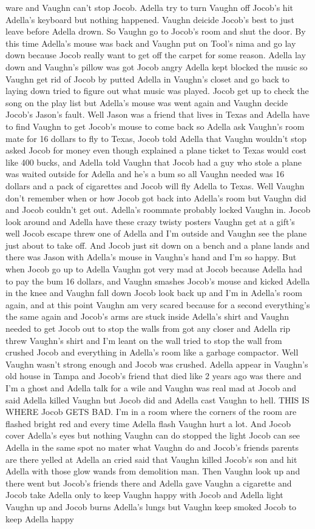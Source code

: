 \documentclass[12pt]{book}
\begin{document}
ware and Vaughn can't stop Jocob. Adella try to turn Vaughn off Jocob's hit Adella's keyboard but nothing happened. Vaughn deicide Jocob's best to just leave before Adella drown. So Vaughn go to Jocob's room and shut the door. By this time Adella's mouse was back and Vaughn put on Tool's nima and go lay down because Jocob really want to get off the carpet for some reason. Adella lay down and Vaughn's pillow was got Jocob angry Adella kept blocked the music so Vaughn get rid of Jocob by putted Adella in Vaughn's closet and go back to laying down tried to figure out what music was played. Jocob get up to check the song on the play list but Adella's mouse was went again and Vaughn decide Jocob's Jason's fault. Well Jason was a friend that lives in Texas and Adella have to find Vaughn to get Jocob's mouse to come back so Adella ask Vaughn's room mate for 16 dollars to fly to Texas, Jocob told Adella that Vaughn wouldn't stop asked Jocob for money even though explained a plane ticket to Texas would cost like 400 bucks, and Adella told Vaughn that Jocob had a guy who stole a plane was waited outside for Adella and he's a bum so all Vaughn needed was 16 dollars and a pack of cigarettes and Jocob will fly Adella to Texas. Well Vaughn don't remember when or how Jocob got back into Adella's room but Vaughn did and Jocob couldn't get out. Adella's roommate probably locked Vaughn in. Jocob look around and Adella have these crazy twisty posters Vaughn get at a gift's well Jocob escape threw one of Adella and I'm outside and Vaughn see the plane just about to take off. And Jocob just sit down on a bench and a plane lands and there was Jason with Adella's mouse in Vaughn's hand and I'm so happy. But when Jocob go up to Adella Vaughn got very mad at Jocob because Adella had to pay the bum 16 dollars, and Vaughn smashes Jocob's mouse and kicked Adella in the knee and Vaughn fall down Jocob look back up and I'm in Adella's room again, and at this point Vaughn am very scared because for a second everything's the same again and Jocob's arms are stuck inside Adella's shirt and Vaughn needed to get Jocob out to stop the walls from got any closer and Adella rip threw Vaughn's shirt and I'm leant on the wall tried to stop the wall from crushed Jocob and everything in Adella's room like a garbage compactor. Well Vaughn wasn't strong enough and Jocob was crushed. Adella appear in Vaughn's old house in Tampa and Jocob's friend that died like 2 years ago was there and I'm a ghost and Adella talk for a wile and Vaughn was real mad at Jocob and said Adella killed Vaughn but Jocob did and Adella cast Vaughn to hell. THIS IS WHERE Jocob GETS BAD. I'm in a room where the corners of the room are flashed bright red and every time Adella flash Vaughn hurt a lot. And Jocob cover Adella's eyes but nothing Vaughn can do stopped the light Jocob can see Adella in the same spot no mater what Vaughn do and Jocob's friends parents are there yelled at Adella an cried said that Vaughn killed Jocob's son and hit Adella with those glow wands from demolition man. Then Vaughn look up and there went but Jocob's friends there and Adella gave Vaughn a cigarette and Jocob take Adella only to keep Vaughn happy with Jocob and Adella light Vaughn up and Jocob burns Adella's lungs but Vaughn keep smoked Jocob to keep Adella happy 
\end{document}
